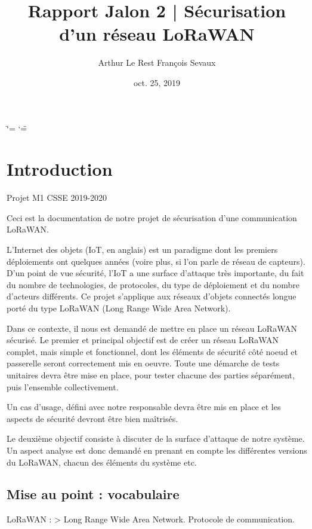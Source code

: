 \documentclass[letterpaper,10pt,french]{sphinxmanual}
\title{Rapport Jalon 2 | Sécurisation d'un réseau LoRaWAN}
\date{oct. 25, 2019}
\author{Arthur Le Rest François Sevaux}
\begin{document}
\ifdefined\shorthandoff
  \ifnum\catcode`\=\string=\active\shorthandoff{=}\fi
  \ifnum\catcode`\"=\active{}\fi
\fi

\pagestyle{empty}
\sphinxmaketitle
\pagestyle{plain}
\sphinxtableofcontents
\pagestyle{normal}
\label{\detokenize{index::doc}}



\chapter{Introduction}
\label{\detokenize{introduction:introduction}}\label{\detokenize{introduction::doc}}
Projet M1 CSSE  2019-2020

Ceci est la documentation de notre projet de sécurisation d’une communication LoRaWAN.


L’Internet des objets (IoT, en anglais) est un paradigme dont les premiers déploiements ont quelques années (voire plus, si l’on parle de réseau de capteurs).
D’un point de vue sécurité, l’IoT a une surface d’attaque très importante, du fait du nombre de technologies, de protocoles, du type de déploiement et du nombre d’acteurs différents.
Ce projet s’applique aux réseaux d’objets connectés longue porté du type LoRaWAN (Long Range Wide Area Network).


Dans ce contexte, il nous est demandé de mettre en place un réseau LoRaWAN sécurisé.
Le premier et principal objectif est de créer un réseau LoRaWAN complet, mais simple et fonctionnel, dont les éléments de sécurité côté noeud et passerelle seront correctement mis en oeuvre.
Toute une démarche de tests unitaires devra être mise en place, pour tester chacune des parties séparément, puis l’ensemble collectivement.

Un cas d’usage, défini avec notre responsable devra être mis en place et les aspects de sécurité devront être bien maîtrisés.

Le deuxième objectif consiste à discuter de la surface d’attaque de notre système.
Un aspect analyse est donc demandé en prenant en compte les différentes versions du LoRaWAN, chacun des éléments du système etc.


\section{Mise au point : vocabulaire}
\label{\detokenize{introduction:mise-au-point-vocabulaire}}
LoRaWAN :
\textgreater{} Long Range Wide Area Network. Protocole de communication.
\end{document}
